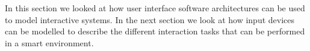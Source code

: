 In this section we looked at how user interface software architectures can be used to model interactive systems. In the next section we look at how input devices can be modelled to describe the different interaction tasks that can be performed in a smart environment.

% 
% 
% 
% 
% 
% 
% 
% 
% 
% 
% 
% 
